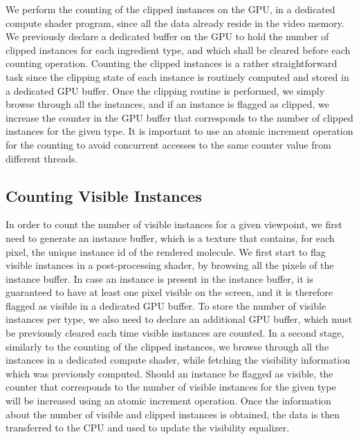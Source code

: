 We perform the counting of the clipped instances on the GPU, in a dedicated compute shader program, since all the data already reside in the video memory.
We previously declare a dedicated buffer on the GPU to hold the number of clipped instances for each ingredient type, and which shall be cleared before each counting operation.
Counting the clipped instances is a rather straightforward task since the clipping state of each instance is routinely computed and stored in a dedicated GPU buffer.
Once the clipping routine is performed, we simply browse through all the instances, and if an instance is flagged as clipped, we increase the counter in the GPU buffer that corresponds to the number of clipped instances for the given type.
It is important to use an atomic increment operation for the counting to avoid concurrent accesses to the same counter value from different threads. 

\subsection{Counting Visible Instances}

In order to count the number of visible instances for a given viewpoint, we first need to generate an instance buffer, which is a texture that contains, for each pixel, the unique instance id of the rendered molecule.
We first start to flag visible instances in a post-processing shader, by browsing all the pixels of the instance buffer.
In case an instance is present in the instance buffer, it is guaranteed to have at least one pixel visible on the screen, and it is therefore flagged as visible in a dedicated GPU buffer.
To store the number of visible instances per type, we also need to declare an additional GPU buffer, which must be previously cleared each time visible instances are counted.
In a second stage, similarly to the counting of the clipped instances, we browse through all the instances in a dedicated compute shader, while fetching the visibility information which was previously computed.
Should an instance be flagged as visible, the counter that corresponds to the number of visible instances for the given type will be increased using an atomic increment operation.
Once the information about the number of visible and clipped instances is obtained, the data is then transferred to the CPU and used to update the visibility equalizer.

